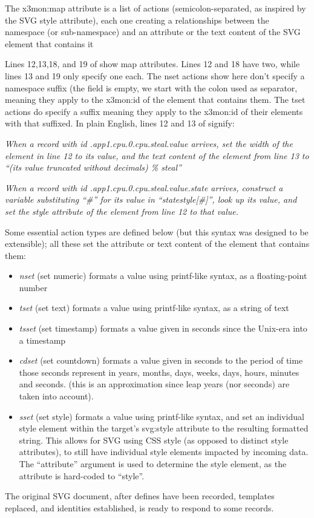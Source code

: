 The x3mon:map attribute is a list of actions (semicolon-separated, as
inspired by the SVG style attribute), each one creating a relationships
between the \rawproto{} namespace (or sub-namespace) and an attribute
or the text content of the SVG element that contains it

Lines 12,13,18, and 19 of  show map attributes.
Lines 12 and 18 have two, while lines 13 and 19 only specify one each.
The nset actions show here don't specify a namespace suffix (the
field is empty, we start with the colon used as separator, meaning
they apply to the x3mon:id of the element that contains them. The tset
actions do specify a suffix meaning they apply to the x3mon:id of their
elements with that suffixed.  In plain English, lines 12 and 13 of
 signify:

\emph{When a record with id
\clientprefix.app1.cpu.0.cpu.steal.value arrives, set
the width of the  element in line 12 to its value, and the
text content of the  element from line 13 to ``(its value
truncated without decimals) \% steal''}

\emph{When a record with id
\clientprefix.app1.cpu.0.cpu.steal.value.state
arrives, construct a variable substituting ``\#'' for its value in
``statestyle[\#]'', look up its value, and set the style attribute of
the  element from line 12 to that value.}

Some essential action types are defined below (but this syntax was
designed to be extensible); all these set the attribute or text content
of the element that contains them:

\begin{itemize} 
\item \emph{nset} (set numeric) formats a value using printf-like syntax, as a floating-point number
\item \emph{tset} (set text) formats a value using printf-like syntax, as a string of text
\item \emph{tsset} (set timestamp) formats a value given in seconds since the
Unix-era into a timestamp
\item \emph{cdset} (set countdown) formats a value given in seconds to the period of time those seconds represent in
years, months, days, weeks, days, hours, minutes and seconds.  (this is an approximation since leap years (nor seconds) are taken into account).
\item \emph{sset} (set style) formats a value using printf-like syntax, and set an individual style element within the target's
svg:style attribute to the resulting formatted string. This allows for SVG using CSS style (as opposed to distinct style attributes),
to still have individual style elements impacted by incoming data. The ``attribute'' argument is used to determine the style
element, as the attribute is hard-coded to ``style''.
\end{itemize}

The original SVG document, after defines have been recorded, templates
replaced, and identities established, is ready to respond to some
\rawproto{} records.
